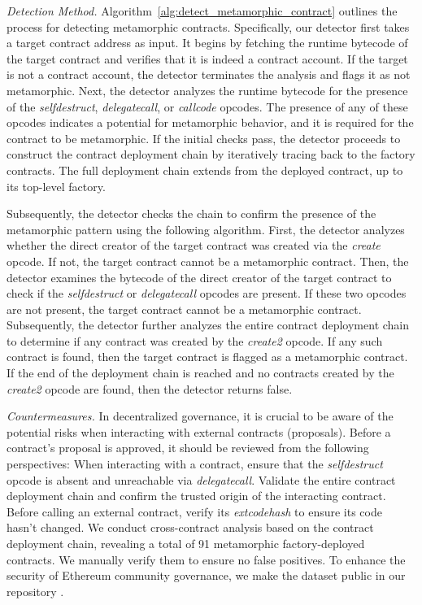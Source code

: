 \documentclass[acmsmall,screen]{acmart}
\begin{document}
	\textit{Detection Method.}
	Algorithm~\ref{alg:detect_metamorphic_contract} outlines the process for detecting metamorphic contracts. Specifically, our detector first takes a target contract address as input. It begins by fetching the runtime bytecode of the target contract and verifies that it is indeed a contract account. If the target is not a contract account, the detector terminates the analysis and flags it as not metamorphic. Next, the detector analyzes the runtime bytecode for the presence of the \textit{selfdestruct}, \textit{delegatecall}, or \textit{callcode} opcodes. The presence of any of these opcodes indicates a potential for metamorphic behavior, and it is required for the contract to be metamorphic. If the initial checks pass, the detector proceeds to construct the contract deployment chain by iteratively tracing back to the factory contracts. The full deployment chain extends from the deployed contract, up to its top-level factory.


	Subsequently, the detector checks the chain to confirm the presence of the metamorphic pattern using the following algorithm. First, the detector analyzes whether the direct creator of the target contract was created via the \textit{create} opcode. If not, the target contract cannot be a metamorphic contract. Then, the detector examines the bytecode of the direct creator of the target contract to check if the \textit{selfdestruct} or \textit{delegatecall} opcodes are present. If these two opcodes are not present, the target contract cannot be a metamorphic contract. Subsequently, the detector further analyzes the entire contract deployment chain to determine if any contract was created by the \textit{create2} opcode. If any such contract is found, then the target contract is flagged as a metamorphic contract. If the end of the deployment chain is reached and no contracts created by the \textit{create2} opcode are found, then the detector returns false.


	\textit{Countermeasures.} In decentralized governance, it is crucial to be aware of the potential risks when interacting with external contracts (proposals). Before a contract's proposal is approved, it should be reviewed from the following perspectives:  When interacting with a contract, ensure that the \textit{selfdestruct} opcode is absent and unreachable via \textit{delegatecall}.  Validate the entire contract deployment chain and confirm the trusted origin of the interacting contract.  Before calling an external contract, verify its \textit{extcodehash} to ensure its code hasn't changed. We conduct cross-contract analysis based on the contract deployment chain, revealing a total of 91 metamorphic factory-deployed contracts. We manually verify them to ensure no false positives. To enhance the security of Ethereum community governance, we make the dataset public in our repository \cite{fscdata}.
\end{document}
